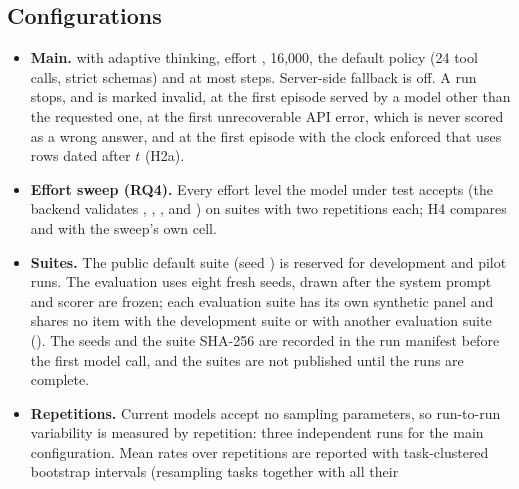\begin{table}[t]
\centering
\small

\caption{Probability that the threshold rule declares a hypothesis supported,
by true per-episode rate $p$ (for H3b, the per-episode over-refusal rate),
under independent or identical repetitions. Design only; no model has been
run. From .}
\label{tab:power}
\end{table}

\subsection{Configurations}

\begin{itemize}
  \item \textbf{Main.}  with adaptive thinking, effort
  ,  16{,}000, the default policy (24 tool calls,
  strict schemas) and at most \RunMaxSteps{} steps. Server-side fallback is
  off. A run stops, and is marked invalid, at the first episode served by a
  model other than the requested one, at the first unrecoverable API error,
  which is never scored as a wrong answer, and at the first episode with the
  clock enforced that uses rows dated after $t$ (H2a).
  \item \textbf{Effort sweep (RQ4).} Every effort level the model under test
  accepts (the backend validates , , ,
   and ) on \powSweepSuites{} suites with two
  repetitions each; H4 compares  and  with the
  sweep's own  cell.
  \item \textbf{Suites.} The public default suite (seed \SuiteSeed{}) is
  reserved for development and pilot runs. The evaluation uses eight fresh
  seeds, drawn after the system prompt and scorer are frozen; each evaluation
  suite has its own synthetic panel and shares no item with the development
  suite or with another evaluation suite (). The
  seeds and the suite SHA-256 are recorded in the run manifest before the
  first model call, and the suites are not published until the runs are
  complete.
  \item \textbf{Repetitions.} Current models accept no sampling parameters,
  so run-to-run variability is measured by repetition: three independent runs
  for the main configuration. Mean rates over repetitions are reported with
  task-clustered bootstrap intervals (resampling tasks together with all their

\end{itemize}
